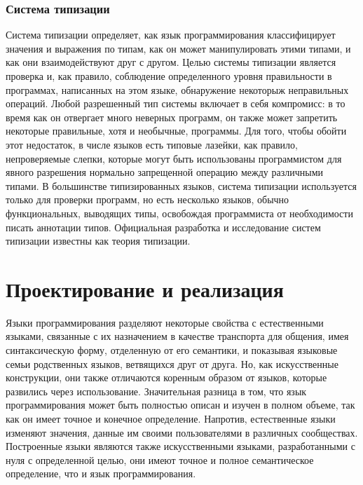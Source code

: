 \subsection{Система типизации}
Система типизации определяет, как язык программирования классифицирует значения
и выражения по типам, как он может манипулировать этими типами, и как они
взаимодействуют друг с другом. Целью системы типизации является проверка и,
как правило, соблюдение определенного уровня правильности в программах,
написанных на этом языке, обнаружение некоторыж неправильных операций. Любой
разрешенный тип системы включает в себя компромисс: в то время как он отвергает
много неверных программ, он также может запретить некоторые правильные, хотя
и необычные, программы. Для того, чтобы обойти этот недостаток, в числе языков
есть типовые лазейки, как правило, непроверяемые слепки, которые могут быть
использованы программистом для явного разрешения нормально запрещенной операцию
между различными типами. В большинстве типизированных языков, система типизации
используется только для проверки программ, но есть несколько языков, обычно
функциональных, выводящих типы, освобождая программиста от необходимости писать
аннотации типов. Официальная разработка и исследование систем типизации
известны как теория типизации.

\chapter{Проектирование и реализация}
Языки программирования разделяют некоторые свойства с естественными языками,
связанные с их назначением в качестве транспорта для общения, имея
синтаксическую форму, отделенную от его семантики, и показывая языковые семьи
родственных языков, ветвящихся друг от друга. Но, как искусственные
конструкции, они также отличаются коренным образом от языков, которые развились
через использование. Значительная разница в том, что язык программирования
может быть полностью описан и изучен в полном объеме, так как он имеет точное и
конечное определение. Напротив, естественные языки изменяют значения, данные им
своими пользователями в различных сообществах. Построенные языки являются также
искусственными языками, разработанными с нуля с определенной целью, они имеют
точное и полное семантическое определение, что и язык программирования.

